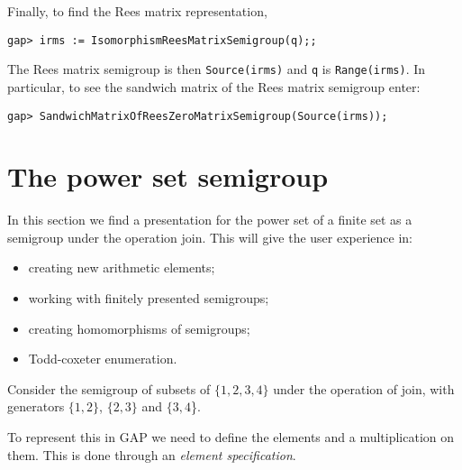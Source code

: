 \documentclass[12pt]{article}
\theoremstyle{plain} \newtheorem{Thm}{Theorem}
\theoremstyle{plain} \newtheorem{Cor}{Corollary}
\theoremstyle{plain} \newtheorem{Lemma}{Lemma}
\theoremstyle{plain} \newtheorem{Prop}{Proposition}
\theoremstyle{plain} \newtheorem{Ex}{Exercise}
\def\gap{\sf GAP}
\begin{document}
Finally, to find the Rees matrix representation, 

\begin{verbatim}
gap> irms := IsomorphismReesMatrixSemigroup(q);;
\end{verbatim}

The Rees matrix semigroup is then {\tt Source(irms)} and 
{\tt q} is {\tt Range(irms)}.  In particular, to see the 
sandwich matrix of the Rees matrix semigroup
enter:

\begin{verbatim}
gap> SandwichMatrixOfReesZeroMatrixSemigroup(Source(irms));
\end{verbatim}


\section{The power set semigroup}
In this section we find a presentation for the power set
of a finite set as a semigroup under the operation join.  
This will give the user experience in:
\begin{itemize}
\item creating new arithmetic elements;
\item working with finitely presented semigroups;
\item creating homomorphisms of semigroups;
\item Todd-coxeter enumeration.
\end{itemize}

Consider the semigroup of subsets of $\{1,2,3,4\}$ under the operation
of join, with generators
$\{1, 2\}$, $\{2, 3\}$ and $\{3, 4$\}.

To represent this in {\gap} we need to define the elements and a
multiplication on them. This is done through an {\em element specification}.
\end{document}
